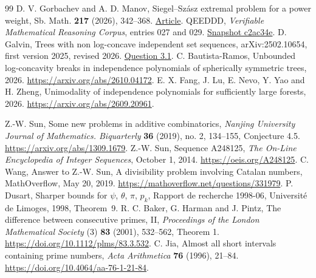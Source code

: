 \documentclass[11pt,a4paper]{article}
\numberwithin{equation}{section}
\begin{document}
\begin{thebibliography}{99}
 D. V. Gorbachev and A. D. Manov, Siegel--Sz\'asz extremal problem for a power weight, Sb. Math. \textbf{217} (2026), 342--368. \href{https://www.mathnet.ru/eng/sm10268}{Article}.
 QEEDDD, \emph{Verifiable Mathematical Reasoning Corpus}, entries 027 and 029. \href{https://github.com/QEEDDD/Verifiable-Mathematical-Reasoning-Corpus/tree/c2ac34ea4622778187173f41bb1996deee8081b7}{Snapshot c2ac34e}.
 D. Galvin, Trees with non log-concave independent set sequences, arXiv:2502.10654, first version 2025, revised 2026. \href{https://arxiv.org/html/2502.10654v2}{Question 3.1}.
 C. Bautista-Ramos, Unbounded log-concavity breaks in independence polynomials of spherically symmetric trees, 2026. \url{https://arxiv.org/abs/2610.04172}.
 E. X. Fang, J. Lu, E. Nevo, Y. Yao and H. Zheng, Unimodality of independence polynomials for sufficiently large forests, 2026. \url{https://arxiv.org/abs/2609.20961}.

Z.-W. Sun, Some new problems in additive combinatorics,
\emph{Nanjing University Journal of Mathematics. Biquarterly}
\textbf{36} (2019), no. 2, 134--155, Conjecture 4.5.
\url{https://arxiv.org/abs/1309.1679}.
Z.-W. Sun, Sequence A248125, \emph{The On-Line Encyclopedia of
Integer Sequences}, October 1, 2014. \url{https://oeis.org/A248125}.
C. Wang, Answer to Z.-W. Sun, A divisibility problem involving Catalan
numbers, MathOverflow, May 20, 2019.
\url{https://mathoverflow.net/questions/331979}.
P. Dusart, Sharper bounds for $\psi$, $\theta$, $\pi$, $p_k$,
Rapport de recherche 1998-06, Universit\'e de Limoges, 1998,
Theorem~9.
R. C. Baker, G. Harman and J. Pintz, The difference between consecutive
primes, II, \emph{Proceedings of the London Mathematical Society}
(3) \textbf{83} (2001), 532--562, Theorem 1.
\url{https://doi.org/10.1112/plms/83.3.532}.
C. Jia, Almost all short intervals containing prime numbers,
\emph{Acta Arithmetica} \textbf{76} (1996), 21--84.
\url{https://doi.org/10.4064/aa-76-1-21-84}.


\end{thebibliography}
\end{document}

